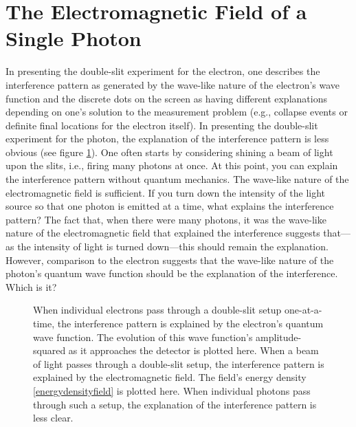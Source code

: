 \documentclass[12pt,secnumarabic,amsmath,amssymb,balancelastpage,nofootinbib]{article}
\begin{document}
\section{The Electromagnetic Field of a Single Photon}\label{EMfieldsinglephoton}

In presenting the double-slit experiment for the electron, one describes the interference pattern as generated by the wave-like nature of the electron's wave function and the discrete dots on the screen as having different explanations depending on one's solution to the measurement problem (e.g., collapse events or definite final locations for the electron itself).  In presenting the double-slit experiment for the photon, the explanation of the interference pattern is less obvious (see figure \ref{doubleslitfigure}).  One often starts by considering shining a beam of light upon the slits, i.e., firing many photons at once.  At this point, you can explain the interference pattern without quantum mechanics.  The wave-like nature of the electromagnetic field is sufficient.  If you turn down the intensity of the light source so that one photon is emitted at a time, what explains the interference pattern?  The fact that, when there were many photons, it was the wave-like nature of the electromagnetic field that explained the interference suggests that---as the intensity of light is turned down---this should remain the explanation.  However, comparison to the electron suggests that the wave-like nature of the photon's quantum wave function should be the explanation of the interference.  Which is it?

\begin{figure}[htb]
\caption{When individual electrons pass through a double-slit setup one-at-a-time, the interference pattern is explained by the electron's quantum wave function.  The evolution of this wave function's amplitude-squared as it approaches the detector is plotted here.  When a beam of light passes through a double-slit setup, the interference pattern is explained by the electromagnetic field.  The field's energy density \eqref{energydensityfield} is plotted here.  When individual photons pass through such a setup, the explanation of the interference pattern is less clear.}
\label{doubleslitfigure}
\end{figure}
\end{document}
